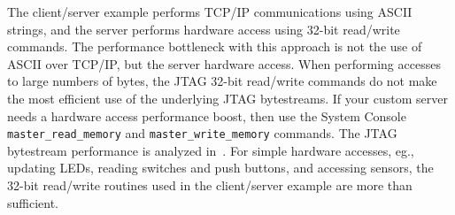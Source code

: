 \documentclass[10pt,twoside]{article}
\begin{document}
The client/server example performs TCP/IP communications using
ASCII strings, and the server performs hardware access using
32-bit read/write commands. The performance bottleneck with
this approach is not the use of ASCII over TCP/IP, but the
server hardware access. When performing accesses to large
numbers of bytes, the JTAG 32-bit read/write commands
do not make the most efficient use of the underlying
JTAG bytestreams. If your custom server needs a hardware
access performance boost, then use the System Console 
\verb+master_read_memory+ and \verb+master_write_memory+ commands.
The JTAG bytestream performance is analyzed 
in~\cite{Hawkins_Altera_JTAG_to_Avalon_Analysis_2012}.
For simple hardware accesses, eg., updating LEDs, reading
switches and push buttons, and accessing sensors, the
32-bit read/write routines used in the client/server example
are more than sufficient.
\end{document}
